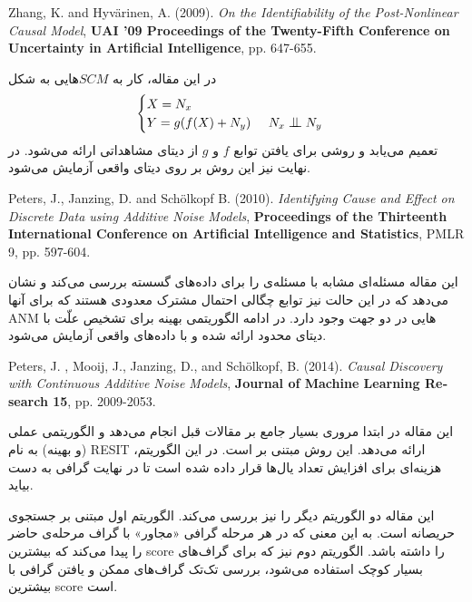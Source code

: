\documentclass{article}
\begin{document}
\begin{enumerate}
\begin{latin}
\item Zhang, K. and Hyvärinen, A. (2009). 
\textit{On the Identifiability of the Post-Nonlinear Causal Model}, \textbf{}
\textbf{UAI '09 Proceedings of the Twenty-Fifth Conference on Uncertainty in Artificial Intelligence}, pp. 647-655.
\end{latin}
در این مقاله، کار
به $SCM$هایی به شکل 
\begin{equation}
\begin{cases}
X = N_x \\
Y = g(f(X) + N_y) \;\;\;\;\; N_x \bigCI N_y
\end{cases}
\end{equation}
تعمیم می‌یابد و روشی برای یافتن توابع $f$ و $g$ از دیتای مشاهداتی ارائه می‌شود. در نهایت نیز این روش بر روی دیتای واقعی آزمایش می‌شود.
\vspace{1cm}
\begin{latin}
\item Peters, J., Janzing, D. and Sch{\"o}lkopf B. (2010).
\textit{Identifying Cause and Effect on Discrete Data using Additive Noise Models}, 
\textbf{Proceedings of the Thirteenth International Conference on Artificial Intelligence and Statistics}, PMLR 9, pp. 597-604.
\end{latin}
این مقاله مسئله‌ای مشابه با مسئله‌ی 
را برای داده‌های گسسته بررسی می‌کند و نشان می‌دهد که در این حالت نیز توابع چگالی احتمال مشترک معدودی هستند که برای آنها ANM هایی در دو جهت وجود دارد. در ادامه الگوریتمی بهینه برای تشخیص علّت با دیتای محدود ارائه شده و با  داده‌های واقعی آزمایش می‌شود.
\vspace{1cm}
\begin{latin}
Peters, J. , Mooij, J., Janzing, D., and Sch{\"o}lkopf, B.  (2014).
\textit{Causal Discovery with Continuous Additive Noise Models}, \textbf{Journal of Machine Learning Research 15}, pp. 2009-2053.
\end{latin}
این مقاله در ابتدا مروری بسیار جامع بر مقالات قبل انجام می‌دهد و الگوریتمی عملی (و بهینه) به نام RESIT ارائه می‌دهد. این روش مبتنی بر 
 است. در این الگوریتم،  هزینه‌ای برای افزایش تعداد یال‌ها قرار داده شده است تا در نهایت  گرافی 
به دست بیاید.

این مقاله دو  الگوریتم دیگر را نیز بررسی می‌کند. الگوریتم اول مبتنی بر جستجوی حریصانه است. به این معنی که در هر مرحله گرافی «مجاور» با گراف مرحله‌ی حاضر را پیدا می‌کند که بیشترین score را داشته باشد. الگوریتم دوم نیز که برای گراف‌های بسیار کوچک استفاده می‌شود، بررسی تک‌تک گراف‌های ممکن و یافتن گرافی با بیشترین score است.


\end{enumerate}
\end{document}

